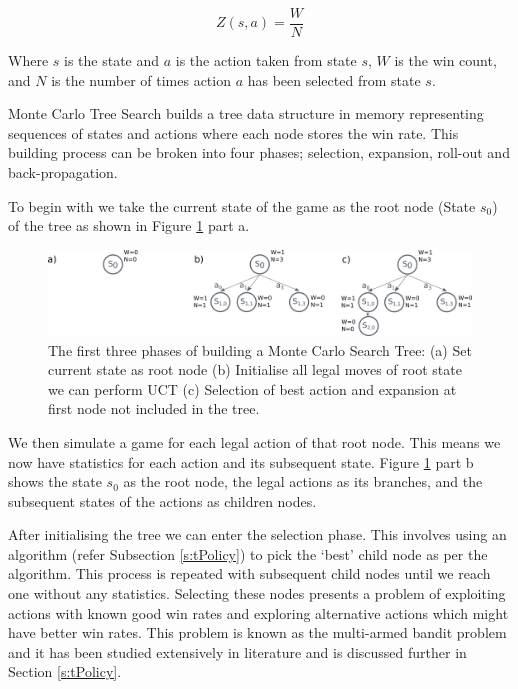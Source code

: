 \documentclass{bhamthesis}
\theoremstyle{definition}
\begin{document}
\begin{equation}\label{utility}
Z(s,a) = \frac{W}{N}
\end{equation} 

Where $s$ is the state and $a$ is the action taken from state $s$, $W$ is the win count, and $N$ is the number of times action $a$ has been selected from state $s$.

Monte Carlo Tree Search builds a tree data structure in memory representing sequences of states and actions where each node stores the win rate. This building process can be broken into four phases; selection, expansion, roll-out and back-propagation.

To begin with we take the current state of the game as the root node (State $s_0$) of the tree as shown in Figure \ref{f:initTree} part a.
\begin{figure}
	\centering
	\includegraphics[width=\textwidth]{media/img/mctsTreeBuildPartOne}
	\caption{The first three phases of building a Monte Carlo Search Tree: (a) Set current state as root node (b) Initialise all legal moves of root state we can perform UCT (c) Selection of best action and expansion at first node not included in the tree.}\label{f:initTree}
\end{figure}
We then simulate a game for each legal action of that root node. This means we now have statistics for each action and its subsequent state. Figure \ref{f:initTree} part b shows the state $s_0$ as the root node, the legal actions as its branches, and the subsequent states of the actions as children nodes.

After initialising the tree we can enter the selection phase. This involves using an algorithm (refer Subsection \ref{s:tPolicy}) to pick the `best' child node as per the algorithm. This process is repeated with subsequent child nodes until we reach one without any statistics. Selecting these nodes presents a problem of exploiting actions with known good win rates and exploring alternative actions which might have better win rates. This problem is known as the multi-armed bandit problem and it has been studied extensively in literature and is discussed further in Section \ref{s:tPolicy}.
\end{document}
